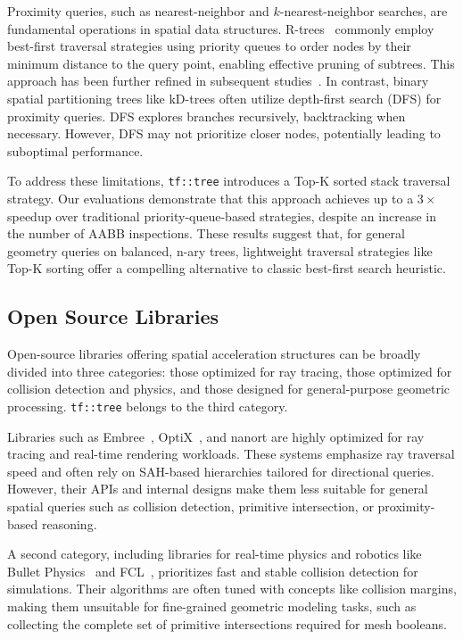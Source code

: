 Proximity queries, such as nearest-neighbor and
$k$-nearest-neighbor searches, are fundamental operations in spatial data
structures. R-trees~\cite{knn0} commonly employ best-first traversal
strategies using priority queues to order nodes by their minimum distance
to the query point, enabling effective pruning of subtrees. This approach
has been further refined in subsequent studies~\cite{eknn, priority-rtree}.
In contrast, binary spatial partitioning trees like kD-trees often utilize
depth-first search (DFS) for proximity queries. DFS explores branches recursively,
backtracking when necessary. However, DFS may not prioritize closer nodes,
potentially leading to suboptimal performance.

To address these limitations, \texttt{tf::tree} introduces a Top-K sorted
stack traversal strategy. Our evaluations demonstrate that this approach
achieves up to a $3\times$ speedup over traditional priority-queue-based
strategies, despite an increase in the number of AABB inspections.
These results suggest that, for general geometry queries on balanced,
n-ary trees, lightweight traversal strategies like Top-K sorting offer a
compelling alternative to classic best-first search heuristic.

\subsection{Open Source Libraries}



Open-source libraries offering spatial acceleration structures can be
broadly divided into three categories: those optimized for ray tracing,
those optimized for collision detection and physics,
and those designed for general-purpose geometric processing.
\texttt{tf::tree} belongs to the third category.

Libraries such as Embree~\cite{embree}, OptiX~\cite{optix}, and nanort\cite{nanort}
are highly optimized for ray tracing and real-time rendering workloads.
These systems emphasize ray traversal speed and often rely on SAH-based
hierarchies tailored for directional queries. However, their APIs and
internal designs make them less suitable for general spatial queries such
as collision detection, primitive intersection, or proximity-based reasoning.

A second category, including libraries for real-time physics and robotics
like Bullet Physics~\cite{bullet} and FCL~\cite{fcl}, prioritizes fast and
stable collision detection for simulations. Their algorithms are often tuned
with concepts like collision margins, making them unsuitable for fine-grained
geometric modeling tasks, such as collecting the complete set of primitive
intersections required for mesh booleans.

